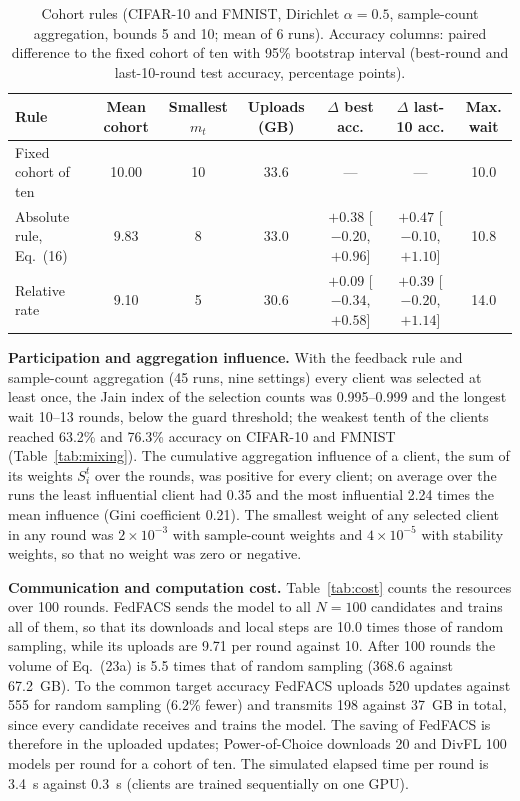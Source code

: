 \begin{table}[!htbp]
\centering
\footnotesize
\setlength{\tabcolsep}{3pt}
\renewcommand{\arraystretch}{1.08}
\caption{Cohort rules (CIFAR-10 and FMNIST, Dirichlet $\alpha=0.5$, sample-count aggregation, bounds 5 and 10; mean of 6 runs). Accuracy columns: paired difference to the fixed cohort of ten with 95\% bootstrap interval (best-round and last-10-round test accuracy, percentage points).}
\label{tab:cohort}
\begin{tabular*}{\journalfloatwidth}{@{\extracolsep{\fill}}lcccccc@{}}
\toprule
Rule & Mean cohort & Smallest $m_t$ & Uploads (GB) & $\Delta$ best acc. & $\Delta$ last-10 acc. & Max. wait \\
\midrule
Fixed cohort of ten & 10.00 & 10 & 33.6 & --- & --- & 10.0 \\
Absolute rule, Eq.~(16) & 9.83 & 8 & 33.0 & $+0.38$ [$-0.20$, $+0.96$] & $+0.47$ [$-0.10$, $+1.10$] & 10.8 \\
Relative rate & 9.10 & 5 & 30.6 & $+0.09$ [$-0.34$, $+0.58$] & $+0.39$ [$-0.20$, $+1.14$] & 14.0 \\
\bottomrule
\end{tabular*}
\end{table}

\textbf{Participation and aggregation influence.} With the feedback rule and sample-count aggregation (45 runs, nine settings) every client was selected at least once, the Jain index of the selection counts was 0.995--0.999 and the longest wait 10--13 rounds, below the guard threshold; the weakest tenth of the clients reached 63.2\% and 76.3\% accuracy on CIFAR-10 and FMNIST (Table~\ref{tab:mixing}). The cumulative aggregation influence of a client, the sum of its weights $S_i^t$ over the rounds, was positive for every client; on average over the runs the least influential client had 0.35 and the most influential 2.24 times the mean influence (Gini coefficient 0.21). The smallest weight of any selected client in any round was $2\times10^{-3}$ with sample-count weights and $4\times10^{-5}$ with stability weights, so that no weight was zero or negative.

\textbf{Communication and computation cost.} Table~\ref{tab:cost} counts the resources over 100 rounds. FedFACS sends the model to all $N=100$ candidates and trains all of them, so that its downloads and local steps are 10.0 times those of random sampling, while its uploads are 9.71 per round against 10. After 100 rounds the volume of Eq.~(23a) is 5.5 times that of random sampling (368.6 against 67.2~GB). To the common target accuracy FedFACS uploads 520 updates against 555 for random sampling (6.2\% fewer) and transmits 198 against 37~GB in total, since every candidate receives and trains the model. The saving of FedFACS is therefore in the uploaded updates; Power-of-Choice downloads 20 and DivFL 100 models per round for a cohort of ten. The simulated elapsed time per round is 3.4~s against 0.3~s (clients are trained sequentially on one GPU).

